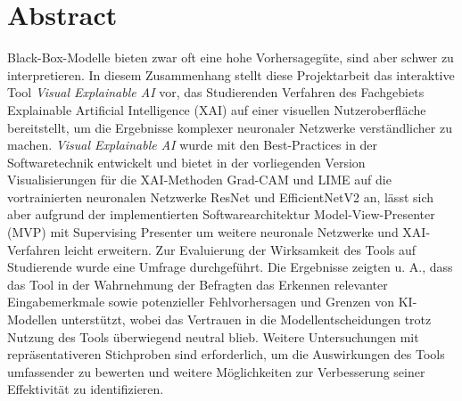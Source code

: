 \chapter*{Abstract}

Black-Box-Modelle bieten zwar oft eine hohe Vorhersagegüte, sind aber schwer zu interpretieren.
In diesem Zusammenhang stellt diese Projektarbeit das interaktive Tool \textit{Visual Explainable AI} vor, das Studierenden Verfahren des Fachgebiets Explainable Artificial Intelligence (XAI) auf einer visuellen Nutzeroberfläche bereitstellt, um die Ergebnisse komplexer neuronaler Netzwerke verständlicher zu machen.
\textit{Visual Explainable AI} wurde mit den Best-Practices in der Softwaretechnik entwickelt und bietet in der vorliegenden Version Visualisierungen für die XAI-Methoden Grad-CAM und LIME auf die vortrainierten neuronalen Netzwerke ResNet und EfficientNetV2 an, lässt sich aber aufgrund der implementierten Softwarearchitektur Model-View-Presenter (MVP) mit Supervising Presenter um weitere neuronale Netzwerke und XAI-Verfahren leicht erweitern.
Zur Evaluierung der Wirksamkeit des Tools auf Studierende wurde eine Umfrage durchgeführt.
Die Ergebnisse zeigten u. A., dass das Tool in der Wahrnehmung der Befragten das Erkennen relevanter Eingabemerkmale sowie potenzieller Fehlvorhersagen und Grenzen von KI-Modellen unterstützt, wobei das Vertrauen in die Modellentscheidungen trotz Nutzung des Tools überwiegend neutral blieb.
Weitere Untersuchungen mit repräsentativeren Stichproben sind erforderlich, um die Auswirkungen des Tools umfassender zu bewerten und weitere Möglichkeiten zur Verbesserung seiner Effektivität zu identifizieren.
